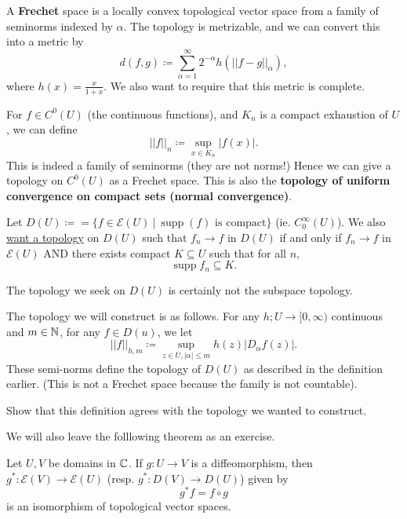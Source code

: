 \documentclass{article}
\begin{document}
{\begin{definition}
    A \textbf{Frechet} space is a locally convex topological vector space from a family of seminorms indexed by $\alpha$. The topology is metrizable, and we can convert this into a metric by
    \[d(f, g) \coloneqq \sum_{\alpha = 1}^\infty 2^{-\alpha} h(||f - g||_\alpha),\]
    where $h(x) = \frac{x}{1 + x}$. We also want to require that this metric is complete.
\end{definition}

\begin{example}
    For $f \in C^0(U)$ (the continuous functions), and $K_n$ is a compact exhaustion of $U$, we can define 
    \[||f||_n \coloneqq \sup_{x \in K_n} |f(x)|.\]
    This is indeed a family of seminorms (they are not norms!) Hence we can give a topology on $C^0(U)$ as a Frechet space. This is also the \textbf{topology of uniform convergence on compact sets (normal convergence)}.
\end{example}

Let $D(U) \coloneqq = \{f \in \mathcal{E}(U)\ |\ \operatorname{supp}(f) \text{ is compact}\}$ (ie. $C^\infty_0(U)$). We also \underline{want a topology} on $D(U)$ such that $f_n \to f$ in $D(U)$ if and only if $f_n \to f$ in $\mathcal{E}(U)$ AND there exists compact $K \subseteq U$ such that for all $n$,
\[\operatorname{supp} f_n \subseteq K.\]

\begin{remark}
   The topology we seek on $D(U)$ is certainly not the subspace topology. 
\end{remark}

\begin{definition}
    The topology we will construct is as follows. For any $h; U \to [0, \infty)$ continuous and $m \in \mathbb{N}$, for any $f \in D(u)$, we let 
    \[||f||_{h, m} \coloneqq \sup_{z \in U, |\alpha| \leq m} h(z) |D_\alpha f(z)|.\]
    These semi-norms define the topology of $D(U)$ as described in the definition earlier. (This is not a Frechet space because the family is not countable).
\end{definition}

\begin{exercise}
    Show that this definition agrees with the topology we wanted to construct.
\end{exercise}

We will also leave the folllowing theorem as an exercise.
\begin{theorem}
    Let $U, V$ be domains in $\mathbb{C}$. If $g: U \to V$ is a diffeomorphism, then $g^*: \mathcal{E}(V) \to \mathcal{E}(U)$ (resp. $g^*: D(V) \to D(U)$) given by
    \[g^* f = f \circ g\]
    is an isomorphism of topological vector spaces.
\end{theorem}

}
\end{document}
